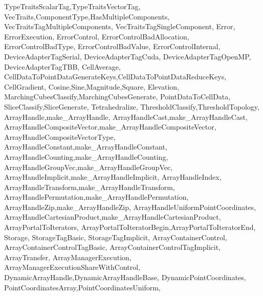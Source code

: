 {{                   TypeTraitsScalarTag,TypeTraitsVectorTag,
                   VecTraits,ComponentType,HasMultipleComponents,
                   VecTraitsTagMultipleComponents,
                   VecTraitsTagSingleComponent,
                   Error, ErrorExecution, ErrorControl,
                   ErrorControlBadAllocation,
                   ErrorControlBadType,
                   ErrorControlBadValue,
                   ErrorControlInternal,
                   DeviceAdapterTagSerial,
                   DeviceAdapterTagCuda,
                   DeviceAdapterTagOpenMP,
                   DeviceAdapterTagTBB,
                   CellAverage,
                   CellDataToPointDataGenerateKeys,CellDataToPointDataReduceKeys,
                   CellGradient,
                   Cosine,Sine,Magnitude,Square,
                   Elevation,
                   MarchingCubesClassify,MarchingCubesGenerate,
                   PointDataToCellData,
                   SliceClassify,SliceGenerate,
                   Tetrahedralize,
                   ThresholdClassify,ThresholdTopology,
                   ArrayHandle,make_ArrayHandle,
                   ArrayHandleCast,make_ArrayHandleCast,
                   ArrayHandleCompositeVector,make_ArrayHandleCompositeVector,
                   ArrayHandleCompositeVectorType,
                   ArrayHandleConstant,make_ArrayHandleConstant,
                   ArrayHandleCounting,make_ArrayHandleCounting,
                   ArrayHandleGroupVec,make_ArrayHandleGroupVec,
                   ArrayHandleImplicit,make_ArrayHandleImplicit,
                   ArrayHandleIndex,
                   ArrayHandleTransform,make_ArrayHandleTransform,
                   ArrayHandlePermutation,make_ArrayHandlePermutation,
                   ArrayHandleZip,make_ArrayHandleZip,
                   ArrayHandleUniformPointCoordinates,
                   ArrayHandleCartesianProduct,make_ArrayHandleCartesianProduct,
                   ArrayPortalToIterators,
                   ArrayPortalToIteratorBegin,ArrayPortalToIteratorEnd,
                   Storage,
                   StorageTagBasic,
                   StorageTagImplicit,
                   ArrayContainerControl,
                   ArrayContainerControlTagBasic,
                   ArrayContainerControlTagImplicit,
                   ArrayTransfer,
                   ArrayManagerExecution,
                   ArrayManagerExecutionShareWithControl,
                   DynamicArrayHandle,DynamicArrayHandleBase,
                   DynamicPointCoordinates,
                   PointCoordinatesArray,PointCoordinatesUniform,
}}
